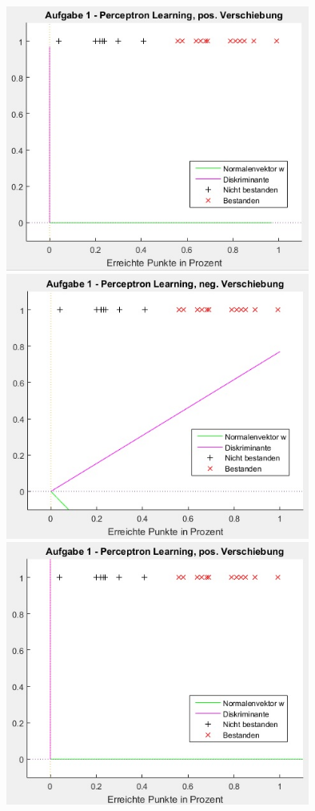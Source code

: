 \documentclass[12pt]{article}
\begin{document}
\begin{center}
\includegraphics[width=10cm]{a1_04.jpg}
\newpage
\includegraphics[width=10cm]{a1_05.jpg}\\
\includegraphics[width=10cm]{a1_06.jpg}

\end{center}
\end{document}

